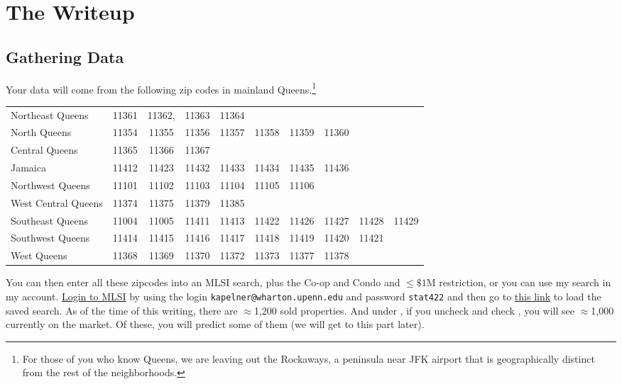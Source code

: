 \documentclass[12pt]{article}
\begin{document}
\section{The Writeup}

\subsection{Gathering Data}

Your data will come from the following zip codes in mainland Queens.\footnote{For those of you who know Queens, we are leaving out the Rockaways, a peninsula near JFK airport that is geographically distinct from the rest of the neighborhoods.}

\begin{table}[htp]
\centering\small
\begin{tabular}{l|ccccccccc}
\hline
Northeast Queens		&11361& 11362,& 11363& 11364 \\
North Queens		&11354& 11355& 11356& 11357& 11358& 11359& 11360 \\
Central Queens		&11365& 11366& 11367 \\
Jamaica				&11412& 11423& 11432& 11433& 11434& 11435& 11436 \\
Northwest Queens	&11101& 11102& 11103& 11104& 11105& 11106 \\
West Central Queens	&11374& 11375& 11379& 11385 \\
Southeast Queens		&11004& 11005& 11411& 11413& 11422& 11426& 11427& 11428& 11429 \\
Southwest Queens	&11414& 11415& 11416& 11417& 11418& 11419& 11420& 11421 \\
West Queens			&11368& 11369& 11370& 11372& 11373& 11377& 11378 \\\hline
\end{tabular}
\end{table}

You can then enter all these zipcodes into an MLSI search, plus the Co-op and Condo and $\leq \$1$M restriction, or you can use my search in my account. \href{https://secure.mlsli.com/Account/CustomerLogin.aspx}{Login to MLSI} by using the login \texttt{kapelner@wharton.upenn.edu} and password \texttt{stat422} and then go to \href{http://www.mlsli.com/listing/listingsearch.aspx?ListingSearch=1455845}{this link} to load the saved search. As of the time of this writing, there are $\approx$1,200 sold properties. And under , if you uncheck  and check , you will see $\approx$1,000 currently on the market. Of these, you will predict some of them (we will get to this part later).\\
\end{document}
